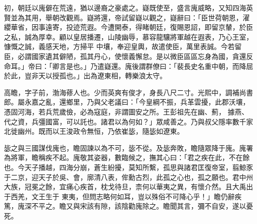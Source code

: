 \begin{pinyinscope}
 初，朝廷以廆僻在荒遠，猶以邊裔之豪處之。嶷既使至，盛言廆威略，又知四海英賢並為其用，舉朝改觀焉。嶷將還，帝試留嶷以觀之，嶷辭曰：「臣世荷朝恩，濯纓華省，因事遠寄，投迹荒遐。今遭開泰，得睹朝廷，復賜恩詔，即留京輦，於臣之私，誠為厚幸。顧以皇居播遷，山陵幽辱，慕容龍驤將軍越在遐表，乃心王室，慷慨之誠，義感天地，方掃平
 中壤，奉迎皇輿，故遣使臣，萬里表誠。今若留臣，必謂國家遺其僻陋，孤其丹心，使懷義懈怠。是以微臣區區忘身為國，貪還反命耳。」帝曰：「卿言是也。」乃遣嶷還。廆後謂群僚曰：「裴長史名重中朝，而降屈於此，豈非天以授孤也。」出為遼東相，轉樂浪太守。



 高瞻，字子前，渤海蓚人也。少而英爽有俊才，身長八尺二寸。光熙中，調補尚書郎。屬永嘉之亂，還鄉里，乃與父老議曰：「今皇綱不振，兵革雲擾，此郡沃壤，憑固河海，若兵荒歲儉，必為寇庭，非謂圖安之所。王彭祖先在幽、薊，
 據燕、代之資，兵彊國富，可以託也。諸君以為何如？」眾咸善之。乃與叔父隱率數千家北徙幽州。既而以王浚政令無恒，乃依崔毖，隨毖如遼東。



 毖之與三國謀伐廆也，瞻固諫以為不可，毖不從。及毖奔敗，瞻隨眾降于廆。廆署為將軍，瞻稱疾不起。廆敬其姿器，數臨候之，撫其心曰：「君之疾在此，不在餘也。今天子播越，四海分崩，蒼生紛擾，莫知所繫，孤思與諸君匡復帝室，翦鯨豕于二京，迎天子於吳、會，廓清八表，侔勳古烈，此孤之心也，孤之願也。君中州大族，冠冕之餘，宜痛心疾首，枕戈待旦，柰何以華夷之異，有懷介然。且大禹出于西羌，文王生于
 東夷，但問志略何如耳，豈以殊俗不可降心乎！」瞻仍辭疾篤，廆深不平之。瞻又與宋該有隙，該陰勸廆除之。瞻聞其言，彌不自安，遂以憂死。



\end{pinyinscope}